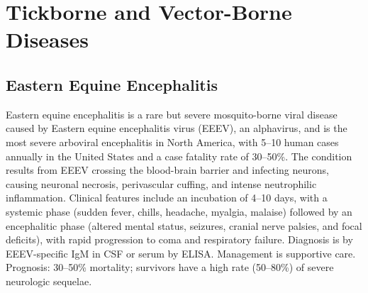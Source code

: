\section{Tickborne and Vector-Borne Diseases}








\label{sec:Tickborne and Vector-Borne Diseases}

\subsection{Eastern Equine Encephalitis}
\label{sec:Eastern Equine Encephalitis}
Eastern equine encephalitis is a rare but severe mosquito-borne viral disease caused by Eastern equine encephalitis virus (EEEV), an alphavirus, and is the most severe arboviral encephalitis in North America, with 5--10 human cases annually in the United States and a case fatality rate of 30--50\%. The condition results from EEEV crossing the blood-brain barrier and infecting neurons, causing neuronal necrosis, perivascular cuffing, and intense neutrophilic inflammation. Clinical features include an incubation of 4--10 days, with a systemic phase (sudden fever, chills, headache, myalgia, malaise) followed by an encephalitic phase (altered mental status, seizures, cranial nerve palsies, and focal deficits), with rapid progression to coma and respiratory failure. Diagnosis is by EEEV-specific IgM in CSF or serum by ELISA. Management is supportive care. Prognosis: 30--50\% mortality; survivors have a high rate (50--80\%) of severe neurologic sequelae.

